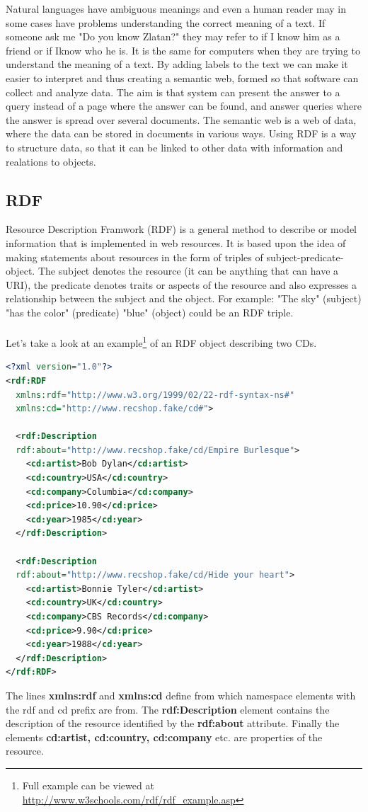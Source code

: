 \documentclass[a4paper,11pt]{kth-mag}
\begin{document}
Natural languages have ambiguous meanings and even
a human reader may in some cases have problems understanding the correct
meaning of a text. If someone ask me  "Do you know Zlatan?" they may refer to if I know him as a friend or if Iknow who he is. It is the same for computers when they are trying to understand the meaning of a text. By adding labels to the text we can make it easier to interpret and thus creating a semantic web, formed so that software can collect and analyze data. The aim is that system can present the answer to a query instead of a page where the answer can be found, and answer queries where the answer is spread over several documents.
The semantic web is a web of data, where the data can be stored in documents in various ways. Using RDF is a way to structure data, so that it can be linked to other data with information and realations to objects.

\subsection{RDF}
Resource Description Framwork (RDF) is a general method to describe or model information that is implemented in web resources. It is based upon the idea of making statements about resources in the form of triples of subject-predicate-object. The subject denotes the resource (it can be anything that can have a URI), the predicate denotes traits or aspects of the resource and also expresses a relationship between the subject and the object. For example: "The sky" (subject) "has the color" (predicate) "blue" (object) could be an RDF triple.\\\\
Let's take a look at an example\footnote{Full example can be viewed at \url{http://www.w3schools.com/rdf/rdf_example.asp}} of an RDF object describing two CDs.
\begin{lstlisting}[language=xml, caption=An RDF example describing two records, label=rdfexample]
<?xml version="1.0"?>
<rdf:RDF 
  xmlns:rdf="http://www.w3.org/1999/02/22-rdf-syntax-ns#"
  xmlns:cd="http://www.recshop.fake/cd#">

  <rdf:Description
  rdf:about="http://www.recshop.fake/cd/Empire Burlesque">
    <cd:artist>Bob Dylan</cd:artist>
    <cd:country>USA</cd:country>
    <cd:company>Columbia</cd:company>
    <cd:price>10.90</cd:price>
    <cd:year>1985</cd:year>
  </rdf:Description>

  <rdf:Description
  rdf:about="http://www.recshop.fake/cd/Hide your heart">
    <cd:artist>Bonnie Tyler</cd:artist>
    <cd:country>UK</cd:country>
    <cd:company>CBS Records</cd:company>
    <cd:price>9.90</cd:price>
    <cd:year>1988</cd:year>
  </rdf:Description>
</rdf:RDF>
\end{lstlisting}
The lines \textbf{xmlns:rdf} and \textbf{xmlns:cd} define from which namespace elements with the rdf and cd prefix are from. The \textbf{rdf:Description} element contains the description of the resource identified by the \textbf{rdf:about} attribute. Finally the elements \textbf{cd:artist, cd:country, cd:company} etc. are properties of the resource.
\end{document}
